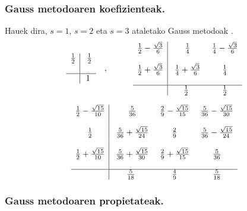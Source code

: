 \subsubsection*{Gauss metodoaren koefizienteak.}

Hauek dira, $s=1$, $s=2$ eta $s=3$ ataletako Gauss metodoak \cite{Hairer2006}.
\begin{equation*}
\begin{array}{c|c}
  \frac{1}{2} & \ \frac{1}{2} \\
  \\
  \hline
   & 1 \\
\end{array} \ \ \ ,  \ \ \ \ \ \ \ \ \
\begin{array}{c|c c}
  \frac{1}{2}-\frac{\sqrt{3}}{6} & \ \frac{1}{4} & \ \frac{1}{4}-\frac{\sqrt{3}}{6} \\
  \\
  \frac{1}{2}+\frac{\sqrt{3}}{6} & \ \frac{1}{4}+\frac{\sqrt{3}}{6} & \ \frac{1}{4} \\
  \\
  \hline
         &  \frac{1}{2} & \ \frac{1}{2} \\
\end{array}
\end{equation*}

\begin{equation*}
\begin{array}{c|c c c}
  \frac{1}{2}-\frac{\sqrt{15}}{10} & \ \frac{5}{36} & \ \frac{2}{9}-\frac{\sqrt{15}}{15} & \ \frac{5}{36}-\frac{\sqrt{15}}{30} \\
  \\
  \frac{1}{2}   & \ \frac{5}{36}+\frac{\sqrt{15}}{24} & \ \frac{2}{9} & \ \frac{5}{36}-\frac{\sqrt{15}}{24} \\
  \\
  \frac{1}{2}+\frac{\sqrt{15}}{10}   & \ \frac{5}{36}+\frac{\sqrt{15}}{30} & \ \frac{2}{9}+\frac{\sqrt{15}}{15} & \ \frac{5}{36} \\
  \\
  \hline
  & \frac{5}{18} & \ \frac{4}{9} & \ \frac{5}{18}
\end{array}
\end{equation*}

\subsubsection*{Gauss metodoaren propietateak.}


